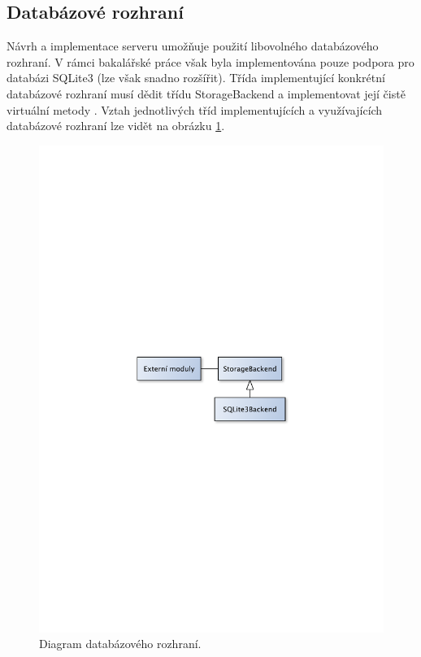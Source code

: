 \subsection{Databázové rozhraní}
\label{implementace_db}

Návrh a implementace serveru umožňuje použití libovolného databázového rozhraní.
V rámci bakalářské práce však byla implementována 
pouze podpora pro databázi SQLite3 (lze však snadno rozšířit). Třída implementující konkrétní databázové rozhraní musí dědit třídu StorageBackend a implementovat
její čistě virtuální metody \cite{oop}. Vztah jednotlivých tříd implementujících a využívajících databázové rozhraní lze vidět
na obrázku \ref{fig:imp_databaze}.

\begin{figure}[h]
\centering
\includegraphics[trim=12cm 12cm 12cm 12cm, scale=0.7]{fig/imp_databaze}
\caption{Diagram databázového rozhraní.}
\label{fig:imp_databaze}
\end{figure}


